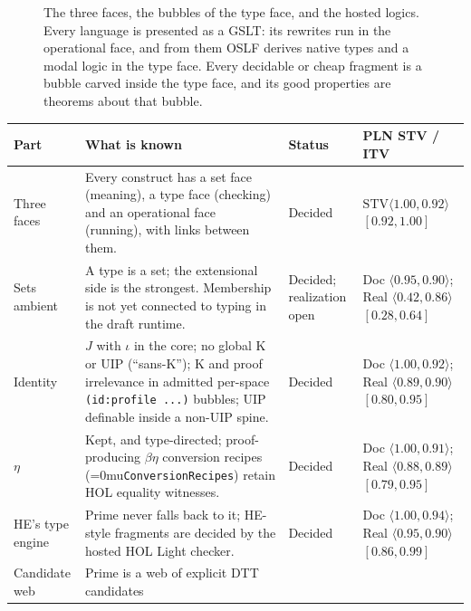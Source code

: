 \documentclass[11pt]{article}
\newcommand{\leanname}[1]{\textup{\Urlmuskip=0mu\relax\nolinkurl{#1}}}
\theoremstyle{definition}
\theoremstyle{remark}
\newcommand{\code}[1]{\texttt{#1}}
\begin{document}
\begin{figure}[ht]
\caption{The three faces, the bubbles of the type face, and the hosted logics.
Every language is presented as a GSLT: its rewrites run in the operational
face, and from them OSLF derives native types and a modal logic in the type
face. Every
decidable or cheap fragment is a bubble carved inside the type face, and its good
properties are theorems about that bubble.}
\label{fig:prime-overview}
\end{figure}

{\small
\begin{longtable}{>{\raggedright\arraybackslash}p{2.3cm}
  >{\raggedright\arraybackslash}p{5.9cm}
  >{\raggedright\arraybackslash}p{2.3cm}
  >{\raggedright\arraybackslash}p{2.5cm}}
\toprule
Part & What is known & Status & PLN STV / ITV\\
\midrule
\endhead
Three faces & Every construct has a set face (meaning), a type face (checking)
  and an operational face (running), with links between them. & Decided &
  $\mathrm{STV}\langle 1.00, 0.92\rangle$ $[0.92,1.00]$\\
Sets ambient & A type is a set; the extensional side is the strongest.
  Membership is not yet connected to typing in the draft runtime. & Decided;
  realization open & Doc $\langle 0.95, 0.90\rangle$; Real $\langle 0.42, 0.86\rangle$ $[0.28,0.64]$\\
Identity & $J$ with $\iota$ in the core; no global K or UIP (``sans-K''); K
  and proof irrelevance in admitted per-space \code{(id:profile ...)} bubbles;
  UIP definable inside a non-UIP spine. & Decided &
  Doc $\langle 1.00, 0.92\rangle$; Real $\langle 0.89, 0.90\rangle$ $[0.80,0.95]$\\
$\eta$ & Kept, and type-directed; proof-producing $\beta\eta$ conversion
  recipes (\leanname{ConversionRecipes}) retain HOL equality witnesses. & Decided &
  Doc $\langle 1.00, 0.91\rangle$; Real $\langle 0.88, 0.89\rangle$ $[0.79,0.95]$\\
HE's type engine & Prime never falls back to it; HE-style fragments are decided
  by the hosted HOL Light checker. & Decided &
  Doc $\langle 1.00, 0.94\rangle$; Real $\langle 0.95, 0.90\rangle$ $[0.86,0.99]$\\
Candidate web & Prime is a web of explicit DTT candidates

\end{longtable}}
\end{document}
